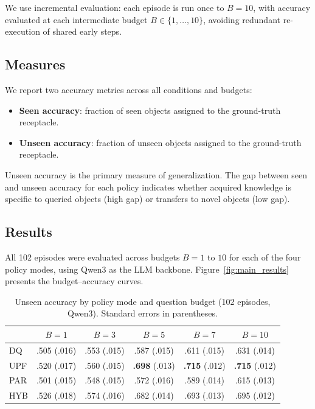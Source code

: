 \documentclass[a4paper,fleqn]{cas-sc}
\begin{document}
We use incremental evaluation: each episode is run once to $B=10$, with accuracy evaluated at each intermediate budget $B \in \{1, \ldots, 10\}$, avoiding redundant re-execution of shared early steps.

\subsection{Measures}

We report two accuracy metrics across all conditions and budgets:
\begin{itemize}[leftmargin=*]
    \item \textbf{Seen accuracy}: fraction of seen objects assigned to the ground-truth receptacle.
    \item \textbf{Unseen accuracy}: fraction of unseen objects assigned to the ground-truth receptacle.
\end{itemize}

Unseen accuracy is the primary measure of generalization. The gap between seen and unseen accuracy for each policy indicates whether acquired knowledge is specific to queried objects (high gap) or transfers to novel objects (low gap).

\subsection{Results}

All 102 episodes were evaluated across budgets $B = 1$ to $10$ for each of the four policy modes, using Qwen3 as the LLM backbone. Figure~\ref{fig:main_results} presents the budget--accuracy curves.

\begin{table}[t]
\caption{Unseen accuracy by policy mode and question budget (102 episodes, Qwen3). Standard errors in parentheses.}\label{tbl:study1_results}
\begin{tabular*}{\tblwidth}{@{}lccccc@{}}
\toprule
 & $B=1$ & $B=3$ & $B=5$ & $B=7$ & $B=10$ \\
\midrule
DQ  & .505 (.016) & .553 (.015) & .587 (.015) & .611 (.015) & .631 (.014) \\
UPF & .520 (.017) & .560 (.015) & \textbf{.698} (.013) & \textbf{.715} (.012) & \textbf{.715} (.012) \\
PAR & .501 (.015) & .548 (.015) & .572 (.016) & .589 (.014) & .615 (.013) \\
HYB & .526 (.018) & .574 (.016) & .682 (.014) & .693 (.013) & .695 (.012) \\
\bottomrule
\end{tabular*}
\end{table}
\end{document}

